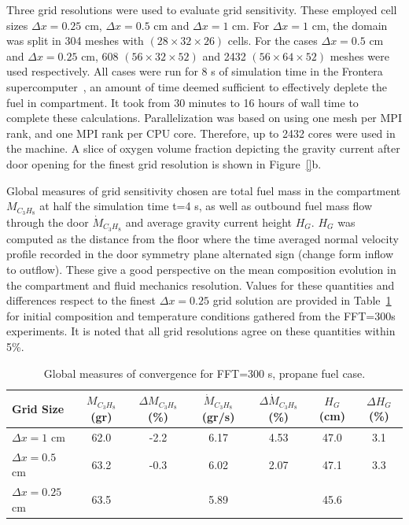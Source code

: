 \documentclass[12pt,letterpaper]{article}
\begin{document}
\begin{flushleft}
Three grid resolutions were used to evaluate grid sensitivity. These employed cell sizes $\Delta x=0.25$ cm, $\Delta x=0.5$ cm and $\Delta x=1$ cm. For $\Delta x=1$ cm, the domain was split in 304 meshes with $(28\times32\times26)$ cells. For the cases $\Delta x=0.5$ cm and $\Delta x=0.25$ cm, 608 $(56\times32\times52)$ and 2432 $(56\times64\times52)$ meshes were used respectively. All cases were run for 8 s of simulation time in the Frontera supercomputer~\cite{frontera}, an amount of time deemed sufficient to effectively deplete the fuel in compartment. It took from 30 minutes to 16 hours of wall time to complete these calculations. Parallelization was based on using one mesh per MPI rank, and one MPI rank per CPU core. Therefore, up to 2432 cores were used in the machine. A slice of oxygen volume fraction depicting the gravity current after door opening for the finest grid resolution is shown in Figure~\ref{}b.   



Global measures of grid sensitivity chosen are total fuel mass in the compartment $M_{C_3H_8}$ at half the simulation time t=4 s, as well as outbound fuel mass flow through the door $\dot{M}_{C_3H_8}$ and average gravity current height $H_G$. 
$H_G$ was computed as the distance from the floor where the time averaged normal velocity profile recorded in the door symmetry plane alternated sign (change form inflow to outflow). 
These give a good perspective on the mean composition evolution in the compartment and fluid mechanics resolution. Values for these quantities and differences respect to the finest  $\Delta x=0.25$ grid solution are provided in Table~\ref{tab:errgrid} for initial composition and temperature conditions gathered from the FFT=300s experiments. It is noted that all grid resolutions agree on these quantities within 5\%.

\begin{table}[h!]
\caption{Global measures of convergence for FFT=300 s, propane fuel case.}
\label{tab:errgrid}
\centering
\footnotesize
\begin{tabular}{l c c c c c c}
\hline
Grid Size & $M_{C_3H_8}$ (gr)	& $\Delta M_{C_3H_8}$ (\%) & $\dot{M}_{C_3H_8}$ (gr/s) & $\Delta \dot{M}_{C_3H_8}$ (\%) & $H_G$ (cm) & $\Delta H_G$ (\%)\\
\hline
$\Delta x=1$    cm & 62.0 & -2.2 & 6.17 & 4.53  & 47.0 & 3.1 \\
$\Delta x=0.5$  cm & 63.2 & -0.3 & 6.02 & 2.07  & 47.1 & 3.3 \\
$\Delta x=0.25$ cm & 63.5 &      & 5.89 &       & 45.6 &  \\
\hline
\end{tabular}
\end{table}




\end{flushleft}
\end{document}
